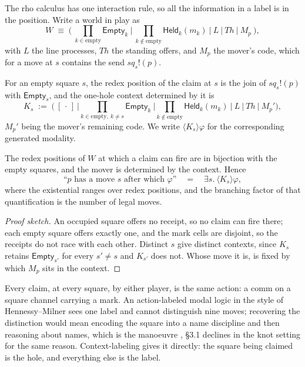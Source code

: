 The rho calculus has one interaction rule, so all the information in a label is
in the position. Write a world in play as
\[
W \;\equiv\; \Big(\ \prod_{k \in \mathrm{empty}} \mathsf{Empty}_k
\ \Big|\ \prod_{k \notin \mathrm{empty}} \mathsf{Held}_k(m_k)
\ \Big|\ L \ \Big|\ \mathit{Th} \ \Big|\ M_p \ \Big),
\]
with $L$ the line processes, $\mathit{Th}$ the standing offers, and $M_p$ the
mover's code, which for a move at $s$ contains the send $\mathit{sq}_s!(p)$.

\begin{definition}\label{gam:def:K}
For an empty square $s$, the redex position of the claim at $s$ is the join of
$\mathit{sq}_s!(p)$ with $\mathsf{Empty}_s$, and the one-hole context
determined by it is
\[
K_s \;:=\; \Big(\ [\,\cdot\,]\ \Big|
\prod_{k \in \mathrm{empty},\ k \neq s}\!\! \mathsf{Empty}_k \ \Big|
\prod_{k \notin \mathrm{empty}}\!\! \mathsf{Held}_k(m_k) \ \Big| \ L \ \Big|\
\mathit{Th} \ \Big| \ M_p' \Big) ,
\]
$M_p'$ being the mover's remaining code. We write $\langle K_s\rangle\varphi$
for the corresponding generated modality.
\end{definition}

\begin{proposition}\label{gam:prop:moves}
The redex positions of $W$ at which a claim can fire are in bijection with the
empty squares, and the mover is determined by the context. Hence
\[
\text{``$p$ has a move $s$ after which $\varphi$''}
\quad=\quad
\exists s.\ \langle K_s \rangle \varphi ,
\]
where the existential ranges over redex positions, and the branching factor of
that quantification is the number of legal moves.
\end{proposition}
\begin{proof}[Proof sketch]
An occupied square offers no receipt, so no claim can fire there; each empty
square offers exactly one, and the mark cells are disjoint, so the receipts do
not race with each other. Distinct $s$ give distinct contexts, since $K_s$
retains $\mathsf{Empty}_{s'}$ for every $s' \neq s$ and $K_{s'}$ does not.
Whose move it is, is fixed by which $M_p$ sits in the context.
\end{proof}

\begin{remark}\label{gam:why-action-label-would}
Every claim, at every square, by either player, is the same action: a comm on a
square channel carrying a mark. An action-labeled modal logic in the style of
Hennessy--Milner sees one label and cannot distinguish nine moves; recovering
the distinction would mean encoding the square into a name discipline and then
reasoning about names, which is the manoeuvre \cite{ClassifierNote}, \S3.1 declines
in the knot setting for the same reason. Context-labeling gives it directly:
the square being claimed is the hole, and everything else is the label.
\end{remark}

